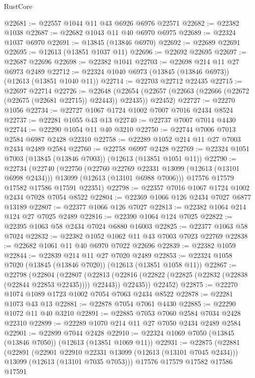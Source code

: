 \begin{lexlean}{RustCore}
\begin{coremodule}
@22681 := @22557 @1044 @11 @43 @6926 @6976 @22571
@22682 := @22382 @1038
@22687 := @22682 @1043 @11 @40 @6970 @6975
@22689 := @22324 @1037 @6970
@22691 := @13845 (@13846 @6970)
@22692 := @22689 @22691
@22695 := @12613 (@13851 @1037 @11)
@22696 := @22692 @22695
@22697 := @22687 @22696
@22698 := @22382 @1041
@22703 := @22698 @214 @11 @27 @6973 @2489
@22712 := @22324 @1040 @6973 (@13845 (@13846 @6973)) (@12613 (@13851 @1040 @11))
@22714 := @22703 @22712 @22435
@22715 := @22697 @22714
@22726 := @22648
    (@22654 (@22657 (@22663 (@22666 (@22672 (@22675 (@22681 @22715)) @22443)) @22435)) @22452)
@22727 := @22270 @1056
@22734 := @22727 @1067 @1724 @1002 @7007 @7016 @2434 @8524
@22737 := @22281 @1055 @43 @13
@22740 := @22737 @7007 @7014 @4430
@22744 := @22290 @1054 @11 @40 @3210
@22750 := @22744 @7006 @7013 @2584 @6987 @2428 @22310
@22758 := @22289 @1052 @214 @11 @27 @7003 @2434 @2489 @2584
@22760 := @22758 @6997 @2428
@22769 := @22324 @1051 @7003 (@13845 (@13846 @7003)) (@12613 (@13851 @1051 @11))
@22790 := @22734
    (@22740
      (@22750
        (@22760 @22769 @22331 @13099 (@12613 (@13101 @6998 @2434)))
        @13099
        (@12613 (@13101 @6988 @7006)))
      @17576
      @17579
      @17582
      @17586
      @17591
      @22351)
@22798 := @22357 @7016 @1067 @1724 @1002 @2434 @7028 @7054 @8522
@22804 := @22369 @1066 @126 @2434 @7027 @6877 @13189
@22807 := @22377 @1066 @126 @7027
@22813 := @22382 @1064 @214 @124 @27 @7025 @2489
@22816 := @22390 @1064 @124 @7025
@22822 := @22395 @1063 @58 @2434 @7024 @6880 @16003
@22825 := @22377 @1063 @58 @7024
@22832 := @22382 @1052 @1062 @11 @43 @7003 @7023 @22769
@22838 := @22682 @1061 @11 @40 @6970 @7022 @22696
@22839 := @22382 @1059
@22844 := @22839 @214 @11 @27 @7020 @2489
@22853 := @22324 @1058 @7020 (@13845 (@13846 @7020)) (@12613 (@13851 @1058 @11))
@22867 := @22798
    (@22804
      (@22807
        (@22813 (@22816 (@22822 (@22825 (@22832 (@22838 (@22844 @22853 @22435)))) @22443)) @22435))
      @22452)
@22875 := @22270 @1074 @1089 @1723 @1002 @7054 @7063 @2434 @8522
@22878 := @22281 @1073 @43 @13
@22881 := @22878 @7054 @7061 @4430
@22885 := @22290 @1072 @11 @40 @3210
@22891 := @22885 @7053 @7060 @2584 @7034 @2428 @22310
@22899 := @22289 @1070 @214 @11 @27 @7050 @2434 @2489 @2584
@22901 := @22899 @7044 @2428
@22910 := @22324 @1069 @7050 (@13845 (@13846 @7050)) (@12613 (@13851 @1069 @11))
@22931 := @22875
    (@22881
      (@22891
        (@22901 @22910 @22331 @13099 (@12613 (@13101 @7045 @2434)))
        @13099
        (@12613 (@13101 @7035 @7053)))
      @17576
      @17579
      @17582
      @17586
      @17591

\end{coremodule}
\end{lexlean}
